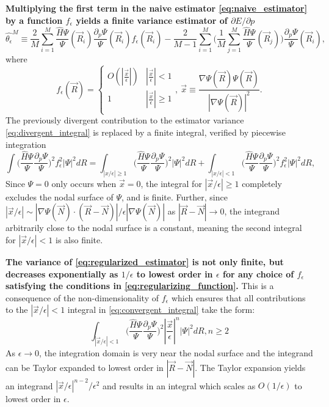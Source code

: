 \documentclass{article}
\begin{document}
\textbf{Multiplying the first term in the naive estimator \eqref{eq:naive_estimator} by a function $f_\epsilon$ yields a finite variance estimator of $\partial E/\partial p$}
\begin{equation}
\hat{\theta_\epsilon}^M \equiv \frac{2}{M}\sum_{i=1}^M \frac{\hat{H}\Psi}{\Psi}(\vec{R}_i)\frac{\partial_p \Psi}{\Psi}(\vec{R}_i) f_\epsilon(\vec{R}_i) - \frac{2}{M-1} \sum_{i=1}^M \Big(\frac{1}{M} \sum_{j=1}^M \frac{\hat{H}\Psi}{\Psi}(\vec{R}_j)\Big)\frac{\partial_p \Psi}{\Psi}(\vec{R}_i), \label{eq:regularized_estimator}
\end{equation}
where 
\begin{equation}
f_\epsilon(\vec{R}) = \begin{cases} 
      O(|\frac{\vec{x}}{\epsilon}|) & |\frac{\vec{x}}{\epsilon}| < 1 \\
      1 & |\frac{\vec{x}}{\epsilon}| \ge 1 \\
   \end{cases},\ \vec{x} \equiv \frac{\nabla \Psi(\vec{R}) \Psi(\vec{R})}{|\nabla \Psi(\vec{R})|^2}.
\label{eq:regularizing_function}
\end{equation} 
The previously divergent contribution to the estimator variance \eqref{eq:divergent_integral} is replaced by a finite integral, verified by piecewise integration
\begin{equation}
\int \Big(\frac{\hat{H}\Psi}{\Psi}\frac{\partial_p\Psi}{\Psi}\Big)^2 f_\epsilon^2 |\Psi|^2 dR =\int_{|x/\epsilon|\geq 1} \Big(\frac{\hat{H}\Psi}{\Psi}\frac{\partial_p\Psi}{\Psi}\Big)^2 |\Psi|^2 dR + \int_{|x/\epsilon|< 1} \Big(\frac{\hat{H}\Psi}{\Psi}\frac{\partial_p\Psi}{\Psi}\Big)^2 f_\epsilon^2 |\Psi|^2 dR,
\label{eq:convergent_integral}
\end{equation}
Since $\Psi = 0$ only occurs when $\vec{x} = 0$, the integral for $|\vec{x}/\epsilon|\geq 1$ completely excludes the nodal surface of $\Psi$, and is finite. 
Further, since $|\vec{x}/\epsilon| \sim |\nabla\Psi(\vec{N}) \cdot (\vec{R}-\vec{N})|/\epsilon|\nabla  \Psi(\vec{N})|$ as $|\vec{R} - \vec{N}| \rightarrow 0$, the integrand arbitrarily close to the nodal surface is a constant, meaning the second integral for $|\vec{x}/\epsilon| < 1$ is also finite.

\textbf{The variance of \eqref{eq:regularized_estimator} is not only finite, but decreases exponentially as $1/\epsilon$ to lowest order in $\epsilon$ for any choice of $f_\epsilon$ satisfying the conditions in \eqref{eq:regularizing_function}.}
This is a consequence of the non-dimensionality of $f_\epsilon$ which ensures that all contributions to the $|\vec{x}/\epsilon|< 1$ integral in \eqref{eq:convergent_integral} take the form:
\begin{equation}
\int_{|\vec{x}/\epsilon|< 1} \Big(\frac{\hat{H}\Psi}{\Psi}\frac{\partial_p\Psi}{\Psi}\Big)^2 |\frac{\vec{x}}{\epsilon}|^n |\Psi|^2 dR, n\geq 2
\end{equation}
As $\epsilon \rightarrow 0$, the integration domain is very near the nodal surface and the integrand can be Taylor expanded to lowest order in $|\vec{R}-\vec{N}|$. 
The Taylor expansion yields an integrand $|\vec{x}/\epsilon|^{n-2}/\epsilon^2$ and results in an integral which scales as $O(1/\epsilon)$ to lowest order in $\epsilon$.
\end{document}
